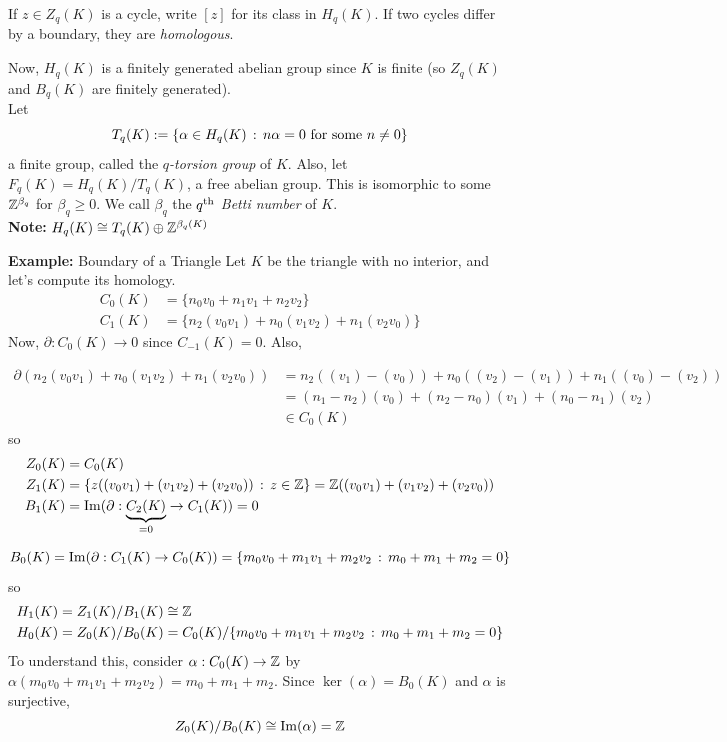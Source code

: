 \begin{definition}
    If $z \in Z_q(K)$ is a cycle, write $[z]$ for its class in $H_q(K)$. If two cycles differ by a boundary, they are \emph{homologous}.
\end{definition}

Now, $H_q(K)$ is a finitely generated abelian group since $K$ is finite (so $Z_q(K)$ and $B_q(K)$ are finitely generated).\\

Let
\[ T_q(K) := \{\alpha \in H_q(K) \col n\alpha = 0 \tt{ for some } n \neq 0\} \]
a finite group, called the \emph{$q$-torsion group} of $K$. Also, let $F_q(K) = H_q(K)/T_q(K)$, a free abelian group. This is isomorphic to some $\Z^{\beta_q}$ for $\beta_q \geq 0$. We call $\beta_q$ the \emph{$q^{\tt{th}}$ Betti number} of $K$.\\

\textbf{Note:} $H_q(K) \cong T_q(K) \oplus \Z^{\beta_q(K)}$

\begin{example}{\textbf{Example:} Boundary of a Triangle}
    Let $K$ be the triangle with no interior, and let's compute its homology.
    \begin{align*}
        C_0(K) &= \{n_0v_0 + n_1v_1 + n_2v_2\}\\
        C_1(K) &= \{n_2(v_0v_1) + n_0(v_1v_2) + n_1(v_2v_0)\}
    \end{align*}
    Now, $\partial : C_0(K) \to 0$ since $C_{-1}(K) = 0$. Also,

    \begin{align*}
        \partial(n_2(v_0v_1) + n_0(v_1v_2) + n_1(v_2v_0)) &= n_2((v_1) - (v_0)) + n_0((v_2) - (v_1)) + n_1((v_0) - (v_2))\\
        &= (n_1 - n_2)(v_0) + (n_2 - n_0)(v_1) + (n_0 - n_1)(v_2)\\
        &\in C_0(K)
    \end{align*}
    so
    \begin{align*}
        Z_0(K) &= C_0(K)\\
        Z_1(K) &= \{z((v_0v_1) + (v_1v_2) + (v_2v_0)) \col z \in \Z\} = \Z((v_0v_1) + (v_1v_2) + (v_2v_0))\\
        B_1(K) &= \operatorname{Im}(\partial : \underbrace{C_2(K)}_{= 0} \to C_1(K)) = 0
    \end{align*}

    \[ B_0(K) = \operatorname{Im}(\partial : C_1(K) \to C_0(K)) = \{m_0v_0 + m_1v_1 + m_2v_2 \col m_0 + m_1 + m_2 = 0\} \]
    so
    \begin{align*}
        H_1(K) &= Z_1(K)/B_1(K) \cong \Z\\
        H_0(K) &= Z_0(K)/B_0(K) = C_0(K)/\{m_0v_0 + m_1v_1 + m_2v_2 \col m_0 + m_1 + m_2 = 0\}
    \end{align*}
    To understand this, consider $\alpha : C_0(K) \to \Z$ by $\alpha(m_0v_0 + m_1v_1 + m_2v_2) = m_0 + m_1 + m_2$. Since $\ker(\alpha) = B_0(K)$ and $\alpha$ is surjective,
    \[ Z_0(K)/B_0(K) \cong \operatorname{Im}(\alpha) = \Z \]
\end{example}


